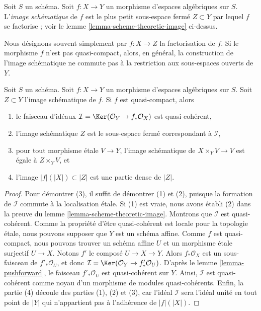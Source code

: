 \begin{definition}
\label{definition-scheme-theoretic-image}
Soit $S$ un schéma. Soit $f : X \to Y$ un morphisme d'espaces algébriques
sur $S$. L'{\it image schématique} de $f$ est le plus petit sous-espace
fermé $Z \subset Y$ par lequel $f$
se factorise ; voir le lemme \ref{lemma-scheme-theoretic-image} ci-dessus.
\end{definition}

\noindent
Nous désignons souvent simplement par $f : X \to Z$ la factorisation de $f$.
Si le morphisme $f$ n'est pas quasi-compact, alors, en général, la
construction de l'image schématique ne commute pas à la
restriction aux sous-espaces ouverts de $Y$.

\begin{lemma}
\label{lemma-quasi-compact-scheme-theoretic-image}
Soit $S$ un schéma.
Soit $f : X \to Y$ un morphisme d'espaces algébriques sur $S$.
Soit $Z \subset Y$ l'image schématique de $f$.
Si $f$ est quasi-compact, alors
\begin{enumerate}
\item le faisceau d'idéaux
$\mathcal{I} = \Ker(\mathcal{O}_Y \to f_*\mathcal{O}_X)$
est quasi-cohérent,
\item l'image schématique $Z$ est le sous-espace fermé
correspondant à $\mathcal{I}$,
\item pour tout morphisme étale $V \to Y$, l'image schématique de
$X \times_Y V \to V$ est égale à $Z \times_Y V$, et
\item l'image $|f|(|X|) \subset |Z|$ est une partie dense de $|Z|$.
\end{enumerate}
\end{lemma}

\begin{proof}
Pour démontrer (3), il suffit de démontrer (1) et (2), puisque la
formation de $\mathcal{I}$ commute à la localisation étale.
Si (1) est vraie, nous avons établi (2) dans la preuve du lemme
\ref{lemma-scheme-theoretic-image}. Montrons que $\mathcal{I}$ est quasi-cohérent.
Comme la propriété d'être quasi-cohérent est locale pour la topologie étale, nous pouvons
supposer que $Y$ est un schéma affine. Comme $f$ est quasi-compact,
nous pouvons trouver un schéma affine $U$ et un morphisme étale surjectif
$U \to X$. Notons $f'$ le composé $U \to X \to Y$.
Alors $f_*\mathcal{O}_X$ est un sous-faisceau de $f'_*\mathcal{O}_U$,
et donc $\mathcal{I} = \Ker(\mathcal{O}_Y \to f'_*\mathcal{O}_U)$.
D'après le lemme \ref{lemma-pushforward},
le faisceau $f'_*\mathcal{O}_U$ est quasi-cohérent sur $Y$. Ainsi, $\mathcal{I}$
est quasi-cohérent comme noyau d'un morphisme de modules quasi-cohérents.
Enfin, la partie (4) découle des parties (1), (2) et (3), car l'idéal
$\mathcal{I}$ sera l'idéal unité en tout point de $|Y|$ qui
n'appartient pas à l'adhérence de $|f|(|X|)$.
\end{proof}

